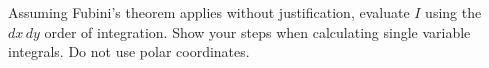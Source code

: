 \documentclass{exam}
\begin{document}
\begin{questions}
\begin{parts}
\item  Assuming Fubini's theorem applies without justification, evaluate $I$ using the $dx \, dy$ order of integration. Show your steps when calculating single variable integrals. Do not use polar coordinates. 
\begin{answer}{480pt}
\end{answer}

\end{parts}

\end{questions}
\end{document}
